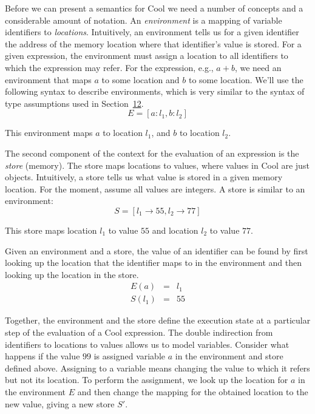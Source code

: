 \documentclass[]{article}
\begin{document}
Before we can present a semantics for Cool we need a number of concepts
and a considerable amount of notation. An \emph{environment} is a
mapping of variable identifiers to \emph{locations}. Intuitively, an
environment tells us for a given identifier the address of the memory
location where that identifier's value is stored. For a given
expression, the environment must assign a location to all identifiers to
which the expression may refer. For the expression, e.g., $a + b$, we
need an environment that maps $a$ to some location and $b$ to some
location. We'll use the following syntax to describe environments, which
is very similar to the syntax of type assumptions used in
Section~\href{node41.html\#sec-typrules}{12}. \\

\begin{displaymath}
E = [ a:l_1, b:l_2]
\end{displaymath}

This environment maps $a$ to location $l_1$, and $b$ to location $l_2$.

The second component of the context for the evaluation of an expression
is the \emph{store} (memory). The store maps locations to values, where
values in Cool are just objects. Intuitively, a store tells us what
value is stored in a given memory location. For the moment, assume all
values are integers. A store is similar to an environment: \\

\begin{displaymath}
S = [ l_1\rightarrow 55, l_2\rightarrow 77 ]
\end{displaymath}

This store maps location $l_1$ to value $55$ and location $l_2$ to value
$77$.

Given an environment and a store, the value of an identifier can be
found by first looking up the location that the identifier maps to in
the environment and then looking up the location in the store. \\

\begin{displaymath}
\begin{array}{rcl}
E(a) &=& l_1 \\
S(l_1) & = & 55
\end{array}\end{displaymath}

Together, the environment and the store define the execution state at a
particular step of the evaluation of a Cool expression. The double
indirection from identifiers to locations to values allows us to model
variables. Consider what happens if the value $99$ is assigned variable
$a$ in the environment and store defined above. Assigning to a variable
means changing the value to which it refers but not its location. To
perform the assignment, we look up the location for $a$ in the
environment $E$ and then change the mapping for the obtained location to
the new value, giving a new store $S'$.
\end{document}
